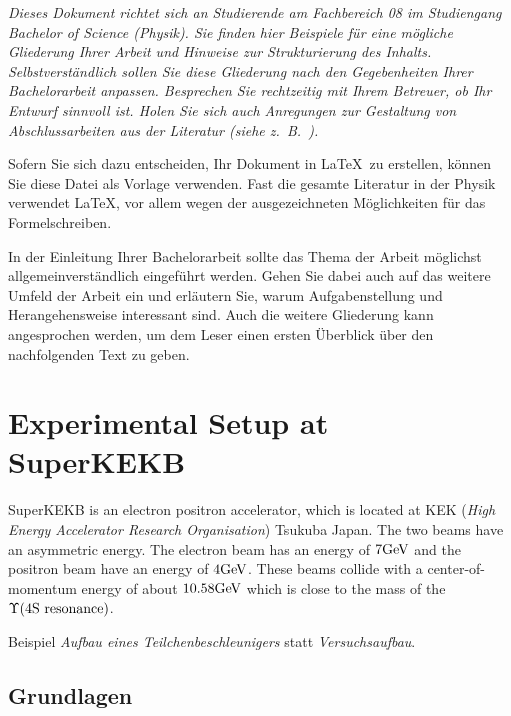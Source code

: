 \documentclass[a4paper,11pt,oneside,final,german,openbib,pdftex]{scrbook}
\begin{document}
{\em Dieses Dokument richtet sich an Studierende am Fachbereich 08 im 
Studiengang Bachelor of Science (Physik). Sie finden hier Beispiele 
f\"ur eine m\"ogliche Gliederung Ihrer Arbeit und Hinweise zur 
Strukturierung des Inhalts. Selbstverst\"andlich sollen Sie diese 
Gliederung nach den Gegebenheiten Ihrer Bachelorarbeit anpassen. 
Besprechen Sie rechtzeitig mit Ihrem Betreuer, ob Ihr Entwurf sinnvoll 
ist. Holen Sie sich auch Anregungen zur Gestaltung von Abschlussarbeiten 
aus der Literatur (siehe z.\ B.\ \cite{EbelBliefert}).
\medskip

Sofern Sie sich dazu entscheiden, Ihr Dokument in \LaTeX\ zu erstellen, 
k\"onnen Sie diese Datei als Vorlage verwenden. Fast die gesamte 
Literatur in der Physik verwendet \LaTeX, vor allem wegen der 
ausgezeichneten M\"oglichkeiten f\"ur das Formelschreiben.
}
\bigskip

In der Einleitung Ihrer Bachelorarbeit sollte das Thema der Arbeit 
m\"oglichst allgemeinverst\"andlich eingef\"uhrt werden. Gehen Sie 
dabei auch auf das weitere Umfeld der Arbeit ein und erl\"autern Sie, 
warum Aufgabenstellung und Herangehensweise interessant sind. Auch 
die weitere Gliederung kann angesprochen werden, um dem Leser einen 
ersten \"Uberblick \"uber den nachfolgenden Text zu geben.

\chapter{Experimental Setup at SuperKEKB}

SuperKEKB is an electron positron accelerator, which is located at KEK (\textit{High Energy Accelerator Research Organisation}) Tsukuba Japan. The two beams have an asymmetric energy. 
The electron beam has an energy of $7 \textnormal{GeV}$ 
and the positron beam have an energy of $4\textnormal{GeV}$. These beams collide with a center-of-momentum energy of about $10.58\textnormal{GeV}$ which is close to the mass of the $\Upsilon(4\textnormal{S resonance})$.

\medskip

Beispiel {\em Aufbau eines Teilchenbeschleunigers} statt 
{\em Versuchsaufbau}.


\section{Grundlagen}
\end{document}
